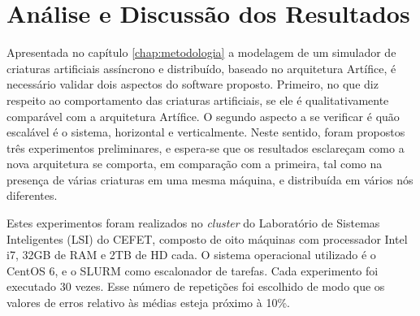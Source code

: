 \chapter{Análise e Discussão dos Resultados}
\label{chap:resultados}
Apresentada no capítulo \autoref{chap:metodologia} a modelagem de um simulador de criaturas artificiais assíncrono e distribuído, baseado no arquitetura Artífice, é necessário validar dois aspectos do software proposto. Primeiro, no que diz respeito ao comportamento das criaturas artificiais, se ele é qualitativamente comparável com a arquitetura Artífice. O segundo aspecto a se verificar é quão escalável é o sistema, horizontal e verticalmente. Neste sentido, foram propostos três experimentos preliminares, e espera-se que os resultados esclareçam como a nova arquitetura se comporta, em comparação com a primeira, tal como na presença de várias criaturas em uma mesma máquina, e distribuída em vários nós diferentes.

Estes experimentos foram realizados no \textit{cluster} do Laboratório de Sistemas Inteligentes (LSI) do CEFET, composto de oito máquinas com processador Intel i7, 32GB de RAM e 2TB de HD cada. O sistema operacional utilizado é o CentOS 6, e o SLURM como escalonador de tarefas. Cada experimento foi executado 30 vezes. Esse número de repetições foi escolhido de modo que os valores de erros relativo às médias esteja próximo à 10\%.

